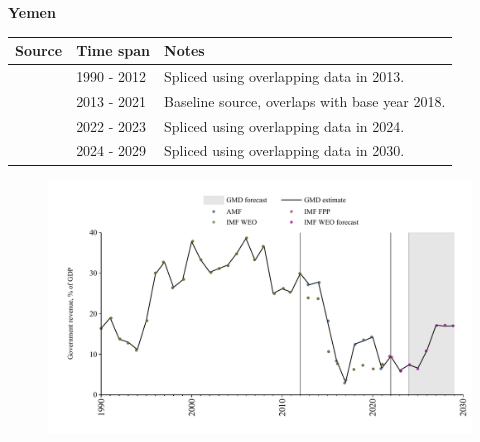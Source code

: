 \documentclass[12pt,a4paper,landscape]{article}
\begin{document}
\begin{adjustbox}{max totalsize={\paperwidth}{\paperheight},center}
\begin{minipage}[t][\textheight][t]{\textwidth}
\vspace*{0.5cm}
{}
\begin{center}
{\Large\bfseries Yemen}
\end{center}
\vspace{0.5cm}
\begin{table}[H]
\centering
\small
\begin{tabular}{|l|l|l|}
\hline
\textbf{Source} & \textbf{Time span} & \textbf{Notes} \\
\hline
\rowcolor{white}\cite{IMF_WEO}& 1990 - 2012 &Spliced using overlapping data in 2013.\\
\rowcolor{lightgray}\cite{AMF}& 2013 - 2021 &Baseline source, overlaps with base year 2018.\\
\rowcolor{white}\cite{IMF_FPP}& 2022 - 2023 &Spliced using overlapping data in 2024.\\
\rowcolor{lightgray}\cite{IMF_WEO_forecast}& 2024 - 2029 &Spliced using overlapping data in 2030.\\
\hline
\end{tabular}
\end{table}
\begin{figure}[H]
\centering
\includegraphics[width=\textwidth,height=0.6\textheight,keepaspectratio]{graphs/YEM_govrev_GDP.pdf}
\end{figure}
\end{minipage}
\end{adjustbox}
\end{document}
